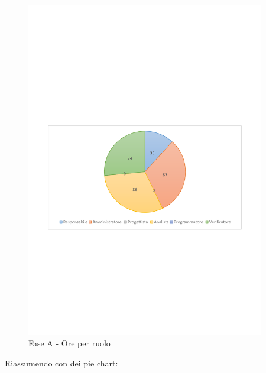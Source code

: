 \documentclass[../PianoProgetto.tex]{subfiles}
\begin{document}
\vfill	
	\begin{figure}[!h]
		\centering
		\includegraphics[width=0.93\textwidth , trim=2cm 9.5cm 2cm 11cm]{grafici/A/A-ore-ruolo}
			\caption{Fase A - Ore per ruolo}
		\label{fig:CircleChart-faseA_ore_r}
	\end{figure}
\vfill	
\newpage
\vfill	
Riassumendo con dei pie chart:
\end{document}
